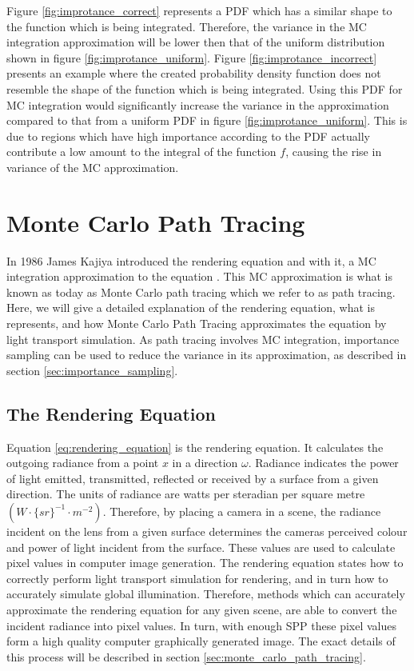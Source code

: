 \documentclass[../dissertation.tex]{subfiles}
\begin{document}
Figure \ref{fig:improtance_correct} represents a PDF which has a similar shape to the function which is being integrated. Therefore, the variance in the MC integration approximation will be lower then that of the uniform distribution shown in figure \ref{fig:improtance_uniform}. Figure \ref{fig:improtance_incorrect} presents an example where the created probability density function does not resemble the shape of the function which is being integrated. Using this PDF for MC integration would significantly increase the variance in the approximation compared to that from a uniform PDF in figure \ref{fig:improtance_uniform}. This is due to regions which have high importance according to the PDF actually contribute a low amount to the integral of the function $f$, causing the rise in variance of the MC approximation.


\section{Monte Carlo Path Tracing}
\label{sec:mc_pathtracing}
In 1986 James Kajiya introduced the rendering equation and with it, a MC integration approximation to the equation \cite{kajiya1986rendering}. This MC approximation is what is known as today as Monte Carlo path tracing which we refer to as path tracing. Here, we will give a detailed explanation of the rendering equation, what is represents, and how Monte Carlo Path Tracing approximates the equation by light transport simulation. As path tracing involves MC integration, importance sampling can be used to reduce the variance in its approximation, as described in section \ref{sec:importance_sampling}.

\subsection{The Rendering Equation}
\label{sec:rendering_equation}

Equation \ref{eq:rendering_equation} is the rendering equation. It calculates the outgoing radiance from a point $x$ in a direction $\omega$. Radiance indicates the power of light emitted, transmitted, reflected or received by a surface from a given direction. The units of radiance are watts per steradian per square metre $(W \cdot \{sr\}^{-1} \cdot m^{-2})$. Therefore, by placing a camera in a scene, the radiance incident on the lens from a given surface determines the cameras perceived colour and power of light incident from the surface. These values are used to calculate pixel values in computer image generation. The rendering equation states how to correctly perform light transport simulation for rendering, and in turn how to accurately simulate global illumination. Therefore, methods which can accurately approximate the rendering equation for any given scene, are able to convert the incident radiance into pixel values. In turn, with enough SPP these pixel values form a high quality computer graphically generated image. The exact details of this process will be described in section \ref{sec:monte_carlo_path_tracing}.
\end{document}
